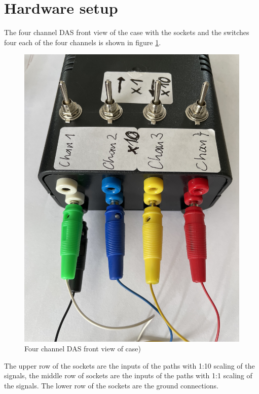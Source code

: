 \documentclass[11pt, oneside]{scrartcl}   	%
\begin{document}
\section{Hardware setup}
The four channel DAS front view of the case with the sockets and the switches four each of the four channels is shown in figure \ref{fig:HWExternals}.
\begin{figure}[htbp]
	\centering
	\includegraphics[angle=180,width=0.85\linewidth]{Figures/HWExternals.jpeg}
	\caption{Four channel DAS front view of case)}
	\label{fig:HWExternals}
\end{figure}
The upper row of the sockets are the inputs of the paths with 1:10 scaling of the signals, the middle row of sockets are the inputs of the paths with 1:1 scaling of the signals.
The lower row of the sockets are the ground connections.
\end{document}
